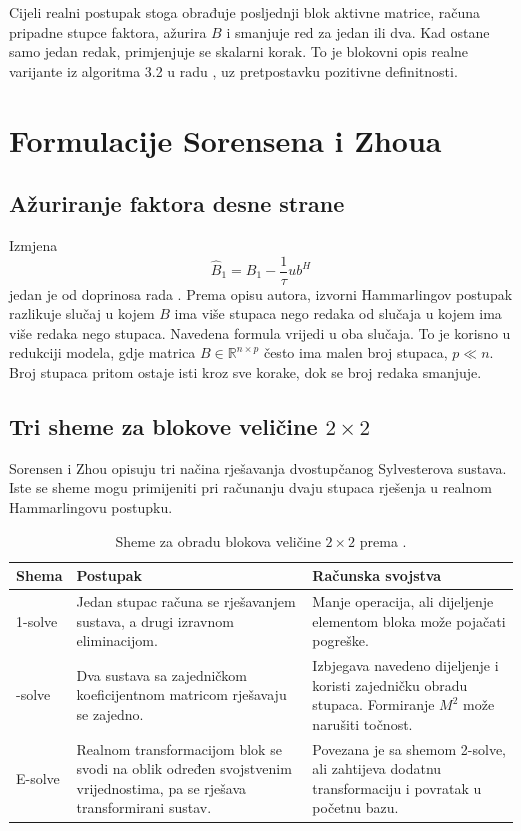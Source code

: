 \documentclass[12pt,a4paper]{article}
\begin{document}
Cijeli realni postupak stoga obrađuje posljednji blok aktivne matrice, računa pripadne stupce faktora, ažurira $B$ i smanjuje red za jedan ili dva. Kad ostane samo jedan redak, primjenjuje se skalarni korak. To je blokovni opis realne varijante iz algoritma 3.2 u radu \cite{sorensen}, uz pretpostavku pozitivne definitnosti.

\section{Formulacije Sorensena i Zhoua}

\subsection{Ažuriranje faktora desne strane}

Izmjena
\[
\widehat{B}_1 = B_1 - \frac{1}{\tau}ub^{H}
\]
jedan je od doprinosa rada \cite{sorensen}. Prema opisu autora, izvorni Hammarlingov postupak razlikuje slučaj u kojem $B$ ima više stupaca nego redaka od slučaja u kojem ima više redaka nego stupaca. Navedena formula vrijedi u oba slučaja. To je korisno u redukciji modela, gdje matrica $B \in \mathbb{R}^{n\times p}$ često ima malen broj stupaca, $p \ll n$. Broj stupaca pritom ostaje isti kroz sve korake, dok se broj redaka smanjuje.

\subsection{Tri sheme za blokove veličine $2\times 2$}

Sorensen i Zhou opisuju tri načina rješavanja dvostupčanog Sylvesterova sustava. Iste se sheme mogu primijeniti pri računanju dvaju stupaca rješenja u realnom Hammarlingovu postupku.

\begin{table}[htbp]
\centering
\small
\begin{tabular}{p{} p{} p{}}
\toprule
Shema & Postupak & Računska svojstva \\
\midrule
1-solve & Jedan stupac računa se rješavanjem sustava, a drugi izravnom eliminacijom. & Manje operacija, ali dijeljenje elementom bloka može pojačati pogreške. \\
\addlinespace
2-solve & Dva sustava sa zajedničkom koeficijentnom matricom rješavaju se zajedno. & Izbjegava navedeno dijeljenje i koristi zajedničku obradu stupaca. Formiranje $M^2$ može narušiti točnost. \\
\addlinespace
E-solve & Realnom transformacijom blok se svodi na oblik određen svojstvenim vrijednostima, pa se rješava transformirani sustav. & Povezana je sa shemom 2-solve, ali zahtijeva dodatnu transformaciju i povratak u početnu bazu. \\
\bottomrule
\end{tabular}
\caption{Sheme za obradu blokova veličine $2\times 2$ prema \cite{sorensen}.}
\end{table}
\end{document}
